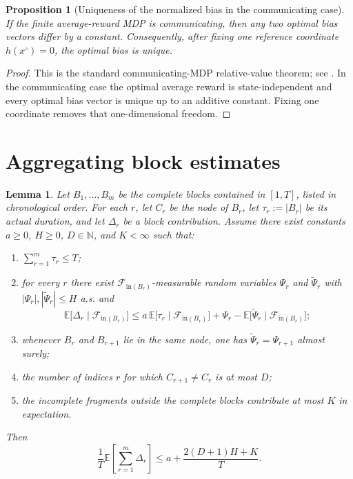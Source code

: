 \documentclass[12pt]{article}
\newtheorem{proposition}[theorem]{Proposition}
\newtheorem{lemma}[theorem]{Lemma}
\theoremstyle{definition}
\newcommand{\N}{\mathbb{N}}
\newcommand{\E}{\mathbb{E}}
\newcommand{\1}{\mathbf{1}}
\newcommand{\cF}{\mathcal{F}}
\begin{document}
\begin{proposition}[Uniqueness of the normalized bias in the communicating case]
\label{prop:bias-unique}
If the finite average-reward MDP is communicating, then any two optimal bias
vectors differ by a constant. Consequently, after fixing one reference coordinate
$h(x^\circ)=0$, the optimal bias is unique.
\end{proposition}

\begin{proof}
This is the standard communicating-MDP relative-value theorem; see
\cite[Chapter~8]{Puterman1994}. In the communicating case the optimal average
reward is state-independent and every optimal bias vector is unique up to an
additive constant. Fixing one coordinate removes that one-dimensional freedom.
\end{proof}


\section{Aggregating block estimates}
\label{app:aggregation}

\begin{lemma}
\label{lem:aggregation}
Let $B_1,\dots,B_m$ be the complete blocks contained in $[1,T]$, listed in
chronological order. For each $r$, let $C_r$ be the node of $B_r$, let
$\tau_r:=|B_r|$ be its actual duration, and let $\Delta_r$ be a block contribution.
Assume there exist constants $a\ge 0$, $H\ge 0$, $D\in\N$, and $K<\infty$ such that:
\begin{enumerate}[label=\textnormal{(\roman*)},leftmargin=2.6em]
\item $\sum_{r=1}^m \tau_r\le T$;
\item for every $r$ there exist $\cF_{\mathrm{in}(B_r)}$-measurable random variables
$\Psi_r$ and $\widetilde\Psi_r$ with $|\Psi_r|,|\widetilde\Psi_r|\le H$ a.s. and
\[
\E\bigl[\Delta_r\mid \cF_{\mathrm{in}(B_r)}\bigr]
\le
a\,\E\bigl[\tau_r\mid \cF_{\mathrm{in}(B_r)}\bigr]
+
\Psi_r-\E\bigl[\widetilde\Psi_r\mid \cF_{\mathrm{in}(B_r)}\bigr];
\]
\item whenever $B_r$ and $B_{r+1}$ lie in the same node, one has
$\widetilde\Psi_r=\Psi_{r+1}$ almost surely;
\item the number of indices $r$ for which $C_{r+1}\neq C_r$ is at most $D$;
\item the incomplete fragments outside the complete blocks contribute at most $K$
in expectation.
\end{enumerate}
Then
\[
\frac1T\E\left[\sum_{r=1}^m \Delta_r\right]
\le a + \frac{2(D+1)H+K}{T}.
\]
\end{lemma}
\end{document}
